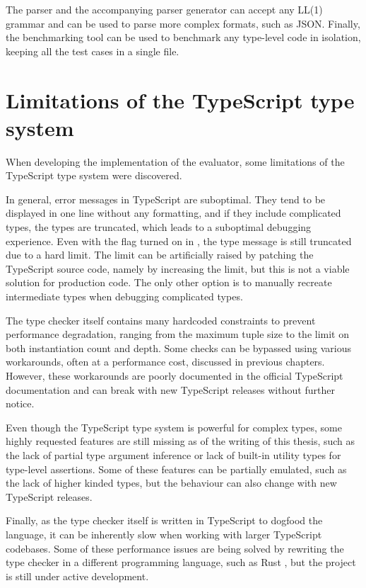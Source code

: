 The parser and the accompanying parser generator can accept any LL(1) grammar and can be used to parse more complex formats, such as JSON. Finally, the benchmarking tool can be used to benchmark any type-level code in isolation, keeping all the test cases in a single file.

\section{Limitations of the TypeScript type system}

When developing the implementation of the evaluator, some limitations of the TypeScript type system were discovered.

In general, error messages in TypeScript are suboptimal. They tend to be displayed in one line without any formatting, and if they include complicated types, the types are truncated, which leads to a suboptimal debugging experience. Even with the  flag turned on in , the type message is still truncated due to a hard limit. The limit can be artificially raised by patching the TypeScript source code, namely by increasing the  limit, but this is not a viable solution for production code. The only other option is to manually recreate intermediate types when debugging complicated types.

The type checker itself contains many hardcoded constraints to prevent performance degradation, ranging from the maximum tuple size to the limit on both instantiation count and depth. Some checks can be bypassed using various workarounds, often at a performance cost, discussed in previous chapters. However, these workarounds are poorly documented in the official TypeScript documentation and can break with new TypeScript releases without further notice.

Even though the TypeScript type system is powerful for complex types, some highly requested features are still missing as of the writing of this thesis, such as the lack of partial type argument inference \cite{ImplementPartialType} or lack of built-in utility types for type-level assertions. Some of these features can be partially emulated, such as the lack of higher kinded types, but the behaviour can also change with new TypeScript releases.

Finally, as the type checker itself is written in TypeScript to dogfood the language, it can be inherently slow when working with larger TypeScript codebases. Some of these performance issues are being solved by rewriting the type checker in a different programming language, such as Rust \cite{Stc2023}, but the project is still under active development.

